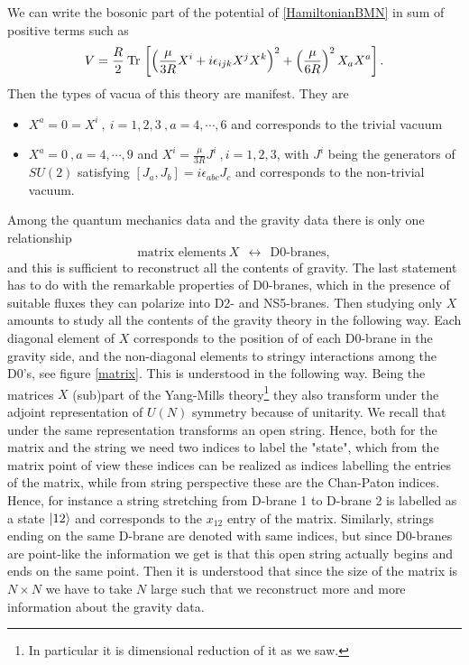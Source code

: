 \documentclass[11pt,english]{article}
\newcommand{\be}{\begin{equation}}
\newcommand{\ee}{\end{equation}}
\newcommand{\Tr}[1]{\:{\rm Tr}\,#1}
\numberwithin{equation}{section}
\begin{document}
We can write the bosonic part of the potential of \eqref{HamiltonianBMN} in sum of positive terms such as 
\be \label{BMNpotential}
V=\frac{R}{2}\Tr{\left[\left(\frac{\mu}{3R}X^i+i\epsilon_{ijk}X^jX^k\right)^2+\left(\frac{\mu}{6R}\right)^2X_aX^a\right]}.
\ee 
Then the types of vacua of this theory are manifest. They are 
\begin{itemize}
	\item $X^a=0=X^i~,~i=1,2,3~,a=4,\cdots, 6$ and corresponds to the trivial vacuum
	\item $X^a=0~,a=4,\cdots,9$ and $X^i=\frac{\mu}{3R}J^i~,i=1,2,3$, with $J^i$ being the generators of $SU(2)$ satisfying $[J_a,J_b]=i\epsilon_{abc}J_c$ and corresponds to the non-trivial vacuum. 
\end{itemize} 

Among the quantum mechanics data and the gravity data there is only one relationship  
\be 
\text{matrix elements} ~X~~ \longleftrightarrow ~~\text{D0-branes},
\ee 
and this is sufficient to reconstruct all the contents of gravity. The last statement has to do with the remarkable properties of D0-branes, which in the presence of suitable fluxes they can polarize into D2- and NS5-branes. Then studying only $X$ amounts to study all the contents of the gravity theory in the following way.  Each diagonal element of $X$ corresponds to the position of of each D0-brane in the gravity side, and the non-diagonal elements to stringy interactions among the D0's, see figure \ref{matrix}. This is understood in the following way. Being the matrices $X$ (sub)part of the Yang-Mills theory\footnote{In particular it is dimensional reduction of it as we saw.} they also transform under the adjoint representation of  $U(N)$ symmetry because of unitarity. We recall that under the same representation transforms an open string. Hence, both for the matrix and the string we need two indices to label the "state", which from the matrix point of view these indices can be realized as indices labelling the entries of the matrix, while from string perspective these are the Chan-Paton indices. Hence, for instance a string stretching from D-brane 1 to D-brane 2 is labelled as a state $\ket{12}$ and corresponds to the $x_{12}$ entry of the matrix. Similarly, strings ending on the same D-brane are denoted with same indices, but since D0-branes are point-like the information we get is that this open string actually begins and ends on the same point.  Then it is understood that since the size of the matrix is $N\times N$ we have to take $N$ large such that we reconstruct more and more information about the gravity data.  
\end{document}

